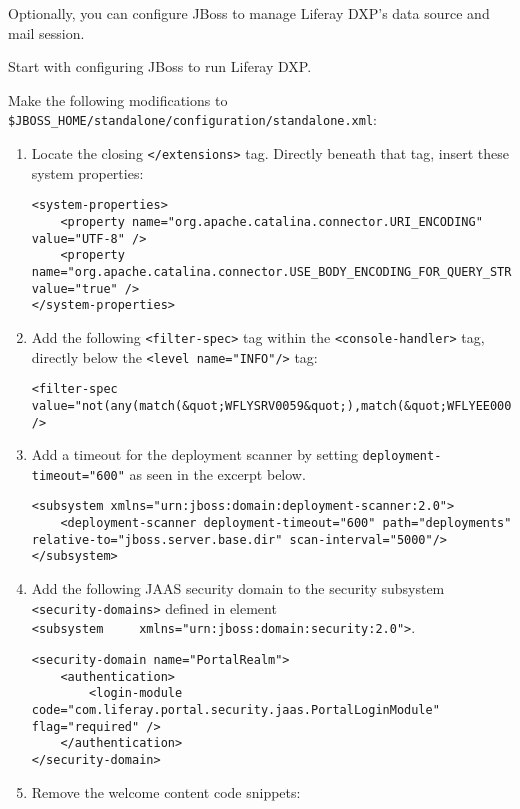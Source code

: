 Optionally, you can configure JBoss to manage Liferay DXP's data source
and mail session.

Start with configuring JBoss to run Liferay DXP.

Make the following modifications to
\texttt{\$JBOSS\_HOME/standalone/configuration/standalone.xml}:

\begin{enumerate}
\def\labelenumi{\arabic{enumi}.}
\item
  Locate the closing \texttt{\textless{}/extensions\textgreater{}} tag.
  Directly beneath that tag, insert these system properties:

\begin{verbatim}
<system-properties>
    <property name="org.apache.catalina.connector.URI_ENCODING" value="UTF-8" />
    <property name="org.apache.catalina.connector.USE_BODY_ENCODING_FOR_QUERY_STRING" value="true" />
</system-properties>
\end{verbatim}
\item
  Add the following \texttt{\textless{}filter-spec\textgreater{}} tag
  within the \texttt{\textless{}console-handler\textgreater{}} tag,
  directly below the
  \texttt{\textless{}level\ name="INFO"/\textgreater{}} tag:

\begin{verbatim}
<filter-spec value="not(any(match(&quot;WFLYSRV0059&quot;),match(&quot;WFLYEE0007&quot;)))" />
\end{verbatim}
\item
  Add a timeout for the deployment scanner by setting
  \texttt{deployment-timeout="600"} as seen in the excerpt below.

\begin{verbatim}
<subsystem xmlns="urn:jboss:domain:deployment-scanner:2.0">
    <deployment-scanner deployment-timeout="600" path="deployments" relative-to="jboss.server.base.dir" scan-interval="5000"/>
</subsystem>
\end{verbatim}
\item
  Add the following JAAS security domain to the security subsystem
  \texttt{\textless{}security-domains\textgreater{}} defined in element
  \texttt{\textless{}subsystem\ \ \ \ \ xmlns="urn:jboss:domain:security:2.0"\textgreater{}}.

\begin{verbatim}
<security-domain name="PortalRealm">
    <authentication>
        <login-module code="com.liferay.portal.security.jaas.PortalLoginModule" flag="required" />
    </authentication>
</security-domain>
\end{verbatim}
\item
  Remove the welcome content code snippets:


\end{enumerate}
